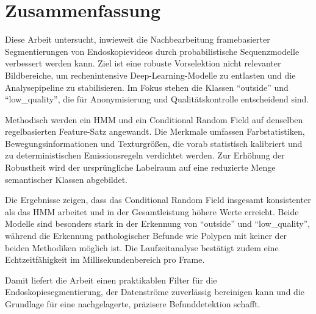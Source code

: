 \chapter*{Zusammenfassung}
Diese Arbeit untersucht, inwieweit die Nachbearbeitung framebasierter Segmentierungen von Endoskopievideos durch probabilistische Sequenzmodelle verbessert werden kann. Ziel ist eine robuste Vorselektion nicht relevanter Bildbereiche, um rechenintensive Deep-Learning-Modelle zu entlasten und die Analysepipeline zu stabilisieren. Im Fokus stehen die Klassen \enquote{outside} und \enquote{low\_quality}, die für Anonymisierung und Qualitätskontrolle entscheidend sind.

Methodisch werden ein HMM und ein Conditional Random Field auf denselben regelbasierten Feature-Satz angewandt. Die Merkmale umfassen Farbstatistiken, Bewegungsinformationen und Texturgrößen, die vorab statistisch kalibriert und zu deterministischen Emissionsregeln verdichtet werden. Zur Erhöhung der Robustheit wird der ursprüngliche Labelraum auf eine reduzierte Menge semantischer Klassen abgebildet.

Die Ergebnisse zeigen, dass das Conditional Random Field insgesamt konsistenter als das HMM arbeitet und in der Gesamtleistung höhere Werte erreicht. Beide Modelle sind besonders stark in der Erkennung von \enquote{outside} und \enquote{low\_quality}, während die Erkennung pathologischer Befunde wie Polypen mit keiner der beiden Methodiken möglich ist. Die Laufzeitanalyse bestätigt zudem eine Echtzeitfähigkeit im Millisekundenbereich pro Frame.

Damit liefert die Arbeit einen praktikablen Filter für die Endoskopiesegmentierung, der Datenströme zuverlässig bereinigen kann und die Grundlage für eine nachgelagerte, präzisere Befunddetektion schafft.

\vfill
